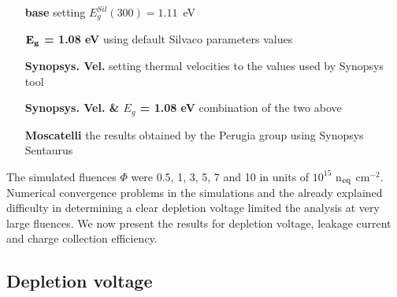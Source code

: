 \begin{center}
\begin{varwidth}{\textwidth}
\begin{itemize}
\item[\bf base] setting $E^{Sil}_g(300)=1.11$~eV
\item[\bf ${\bf E_g}$ = 1.08 eV] using default Silvaco parameters values
\item[\bf Synopsys. Vel.] setting thermal velocities to the values used by Synopsys tool
\item[\bf  Synopsys. Vel. \& $E_g$ = 1.08 eV] combination of the two above 
\item[\bf Moscatelli] the results obtained by the Perugia group using Synopsys Sentaurus
\end{itemize}
\end{varwidth}
\end{center}

The simulated fluences $\Phi$ were 0.5, 1, 3, 5, 7 and 10 in units of $10^{15}$ n$_{\rm eq}$ cm$^{-2}$. 
Numerical convergence problems in the simulations and the already explained difficulty in determining 
a clear depletion voltage  limited the analysis  at very large fluences. We now present the results 
for depletion voltage, leakage current and charge collection efficiency.

\subsection{Depletion voltage}

